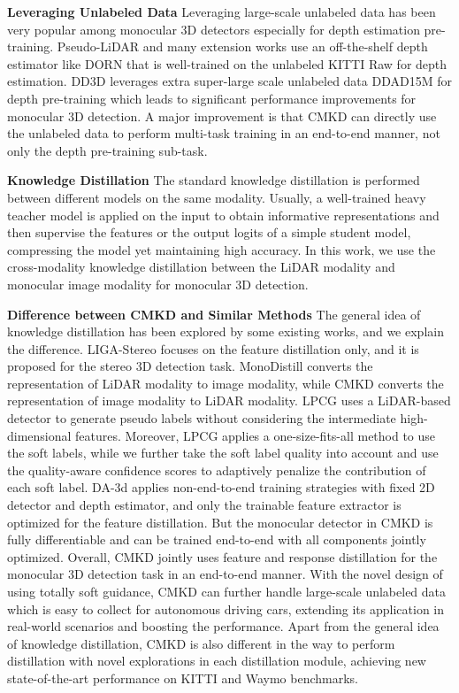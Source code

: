 \documentclass[runningheads]{llncs}
\begin{document}
\noindent\textbf{Leveraging Unlabeled Data}\quad
Leveraging large-scale unlabeled data has been very popular among monocular 3D detectors especially for depth estimation pre-training. 
Pseudo-LiDAR \cite{PL} and many extension works \cite{AMOD,arewemissing,DA-3d} use an off-the-shelf depth estimator like DORN \cite{DORN} that is well-trained on the unlabeled KITTI Raw for depth estimation.
DD3D \cite{dd3d} leverages extra super-large scale unlabeled data DDAD15M for depth pre-training
which leads to significant performance improvements for monocular 3D detection.
A major improvement is that CMKD can directly use the unlabeled data to perform multi-task training in an end-to-end manner, not only the depth pre-training sub-task.

\noindent\textbf{Knowledge Distillation}\quad
The standard knowledge distillation \cite{mimicdet,distilling,likewhatyoulike,bornagain,trainingshallow,generalinstancedistillation} is performed between different models on the same modality.
Usually, a well-trained heavy teacher model is applied on the input to obtain informative representations and then supervise the features or the output logits of a simple student model, compressing the model yet maintaining high accuracy. 
In this work, we use the cross-modality knowledge distillation between the LiDAR modality and monocular image modality for monocular 3D detection.


\noindent\textbf{Difference between CMKD and Similar Methods}\quad
The general idea of knowledge distillation has been explored by some existing works, and we explain the difference.
LIGA-Stereo \cite{LIGA} focuses on the feature distillation only, and it is proposed for the stereo 3D detection task.
MonoDistill \cite{monodistill} converts the representation of LiDAR modality to image modality, while CMKD converts the representation of image modality to LiDAR modality.
LPCG \cite{LPCG} uses a LiDAR-based detector to generate pseudo labels without considering the intermediate high-dimensional features. 
Moreover, LPCG applies a one-size-fits-all method to use the soft labels, while we further take the soft label quality into account and use the quality-aware confidence scores to adaptively penalize the contribution of each soft label. 
DA-3d \cite{DA-3d} applies non-end-to-end training strategies with fixed 2D detector and depth estimator, and only the trainable feature extractor is optimized for the feature distillation. 
But the monocular detector in CMKD is fully differentiable and can be trained end-to-end with all components jointly optimized.
Overall, CMKD jointly uses feature and response distillation for the monocular 3D detection task in an end-to-end manner.
With the novel design of using totally soft guidance, CMKD can further handle large-scale unlabeled data which is easy to collect for autonomous driving cars, extending its application in real-world scenarios and boosting the performance.
Apart from the general idea of knowledge distillation, CMKD is also different in the way to perform distillation with novel explorations in each distillation module, achieving new state-of-the-art performance on KITTI and Waymo benchmarks.
\end{document}
